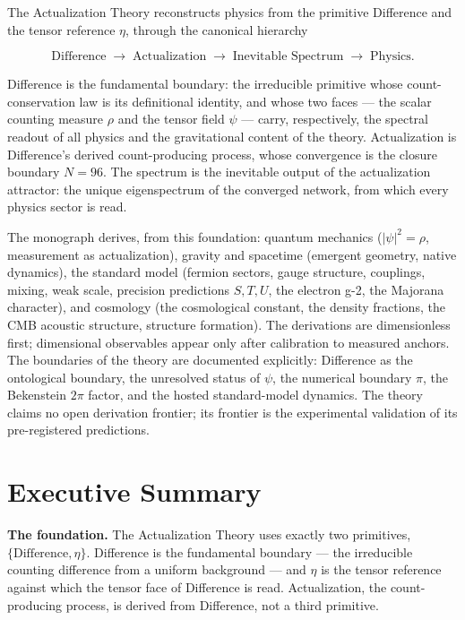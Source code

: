 The Actualization Theory reconstructs physics from the primitive Difference and the tensor
reference $\eta$, through the canonical hierarchy

\[
\text{Difference} \;\longrightarrow\; \text{Actualization}
\;\longrightarrow\; \text{Inevitable Spectrum} \;\longrightarrow\; \text{Physics}.
\]

Difference is the fundamental boundary: the irreducible primitive whose count-conservation
law is its definitional identity, and whose two faces --- the scalar counting measure
$\rho$ and the tensor field $\psi$ --- carry, respectively, the spectral readout of all
physics and the gravitational content of the theory. Actualization is Difference's derived
count-producing process, whose convergence is the closure boundary $N=96$. The spectrum is
the inevitable output of the actualization attractor: the unique eigenspectrum of the
converged network, from which every physics sector is read.

The monograph derives, from this foundation: quantum mechanics ($|\psi|^2=\rho$,
measurement as actualization), gravity and spacetime (emergent geometry, native dynamics),
the standard model (fermion sectors, gauge structure, couplings, mixing, weak scale,
precision predictions $S,T,U$, the electron g-2, the Majorana character), and cosmology
(the cosmological constant, the density fractions, the CMB acoustic structure, structure
formation). The derivations are dimensionless first; dimensional observables appear only
after calibration to measured anchors. The boundaries of the theory are documented
explicitly: Difference as the ontological boundary, the unresolved status of $\psi$, the
numerical boundary $\pi$, the Bekenstein $2\pi$ factor, and the hosted standard-model
dynamics. The theory claims no open derivation frontier; its frontier is the experimental
validation of its pre-registered predictions.

\chapter*{Executive Summary}
\label{fm:abs:executive-summary}

\textbf{The foundation.} The Actualization Theory uses exactly two primitives,
$\{\text{Difference},\eta\}$. Difference is the fundamental boundary --- the irreducible
counting difference from a uniform background --- and $\eta$ is the tensor reference against
which the tensor face of Difference is read. Actualization, the count-producing process, is
derived from Difference, not a third primitive.

